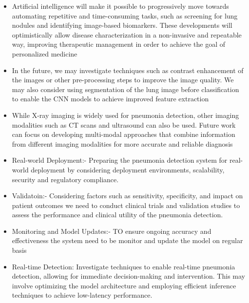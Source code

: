 \begin{itemize}
\item	Artificial intelligence will make it possible to progressively move towards automating repetitive and time-consuming tasks, such as screening for lung nodules and identifying image-based biomarkers. These developments will optimistically allow disease characterization in a non-invasive and repeatable way, improving therapeutic management in order to achieve the goal of personalized medicine \cite{cellina2022artificial}



\item In the future, we may investigate techniques such as contrast enhancement of the images or other pre-processing steps to improve the image quality. We may also consider using segmentation of the lung image before classification to enable the CNN models to achieve improved feature extraction \cite{kundu2021pneumonia}



\item While X-ray imaging is widely used for pneumonia detection, other imaging modalities such as CT scans and ultrasound can also be used. Future work can focus on developing multi-modal approaches that combine information from different imaging modalities for more accurate and reliable diagnosis \\

\item Real-world Deployment:- Preparing  the pneumonia detection system for real-world deployment by considering deployment environments, scalability, security and regulatory compliance.\\

\item Validatoin:- Considering factors such as sensitivity, specificity, and impact on patient outcomes we need to conduct clinical trials and validation studies to assess the performance and clinical utility of the pneumonia detection.\\


\item Monitoring and Model Updates:- TO ensure ongoing accuracy and effectiveness the system need to be monitor and update the model on regular basis\\

\item Real-time Detection: Investigate techniques to enable real-time pneumonia detection, allowing for immediate decision-making and intervention. This may involve optimizing the model architecture and employing efficient inference techniques to achieve low-latency performance.\\


\end{itemize}
